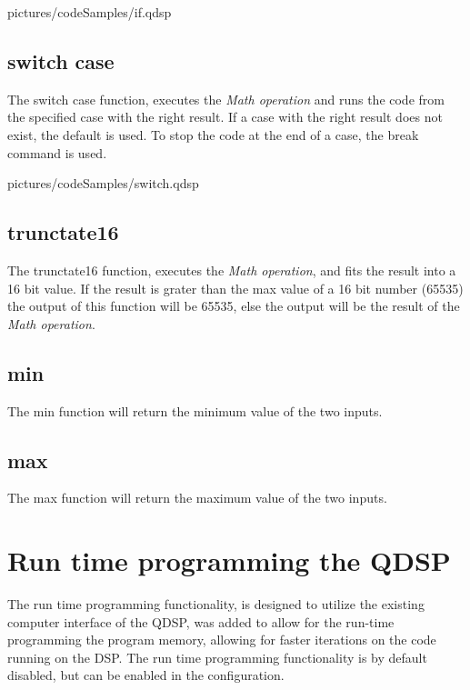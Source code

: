 
  {pictures/codeSamples/if.qdsp}
	
\subsection{switch case}

The switch case function, executes the \textit{Math operation} and runs the code from the specified case with the right result. If a case with the right result does not exist, the default is used. To stop the code at the end of a case, the break command is used. 


  {pictures/codeSamples/switch.qdsp}
	
\subsection{trunctate16}

The trunctate16 function, executes the \textit{Math operation}, and fits the result into a 16 bit value. If the result is grater than the max value of a 16 bit number (65535) the output of this function will be 65535, else the output will be the result of the \textit{Math operation}.

\subsection{min}

The min function will return the minimum value of the two inputs.

\subsection{max}

The max function will return the maximum value of the two inputs.

\section{Run time programming the QDSP}\label{programmingLanguage_runtime}
The run time programming functionality, is designed to utilize the existing computer interface of the QDSP, was added to allow for the run-time programming the program memory, allowing for faster iterations on the code running on the DSP. The run time programming functionality is by default disabled, but can be enabled in the configuration. 

